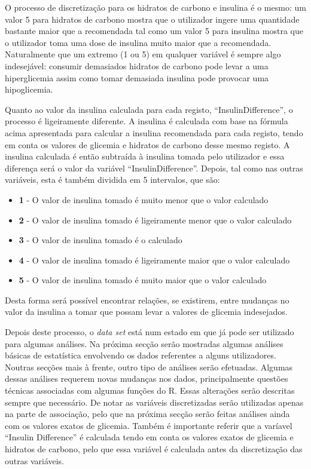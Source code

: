 O processo de discretização para os hidratos de carbono e insulina é o mesmo: um valor 5 para hidratos de carbono mostra que o utilizador ingere uma quantidade bastante maior que a recomendada tal como um valor 5 para insulina mostra que o utilizador toma uma dose de insulina muito maior que a recomendada. Naturalmente que um extremo (1 ou 5) em qualquer variável é sempre algo indesejável: consumir demasiados hidratos de carbono pode levar a uma hiperglicemia assim como tomar demasiada insulina pode provocar uma hipoglicemia.

Quanto ao valor da insulina calculada para cada registo, ``Insulin\textunderscore Difference'', o processo é ligeiramente diferente. A insulina é calculada com base na fórmula acima apresentada para calcular a insulina recomendada para cada registo, tendo em conta os valores de glicemia e hidratos de carbono desse mesmo registo. A insulina calculada é então subtraída à insulina tomada pelo utilizador e essa diferença será o valor da variável ``Insulin\textunderscore Difference''. Depois, tal como nas outras variáveis, esta é também dividida em 5 intervalos, que são:

\begin{itemize}
\item \textbf{1} - O valor de insulina tomado é muito menor que o valor calculado
\item \textbf{2} - O valor de insulina tomado é ligeiramente menor que o valor calculado
\item \textbf{3} - O valor de insulina tomado é o calculado
\item \textbf{4} - O valor de insulina tomado é ligeiramente maior que o valor calculado
\item \textbf{5} - O valor de insulina tomado é muito maior que o valor calculado
\end{itemize}

Desta forma será possível encontrar relações, se existirem, entre mudanças no valor da insulina a tomar que possam levar a valores de glicemia indesejados. 


Depois deste processo, o \textit{data set} está num estado em que já pode ser utilizado para algumas análises. Na próxima secção serão mostradas algumas análises básicas de estatística envolvendo os dados referentes a alguns utilizadores. Noutras secções mais à frente, outro tipo de análises serão efetuadas. Algumas dessas análises requerem novas mudanças nos dados, principalmente questões técnicas associadas com algumas funções do R. Essas alterações serão descritas sempre que necessário. De notar as variáveis discretizadas serão utilizadas apenas na parte de associação, pelo que na próxima secção serão feitas análises ainda com os valores exatos de glicemia. Também é importante referir que a varíavel ``Insulin \textunderscore Difference'' é calculada tendo em conta os valores exatos de glicemia e hidratos de carbono, pelo que essa variável é calculada antes da discretização das outras variáveis. 

